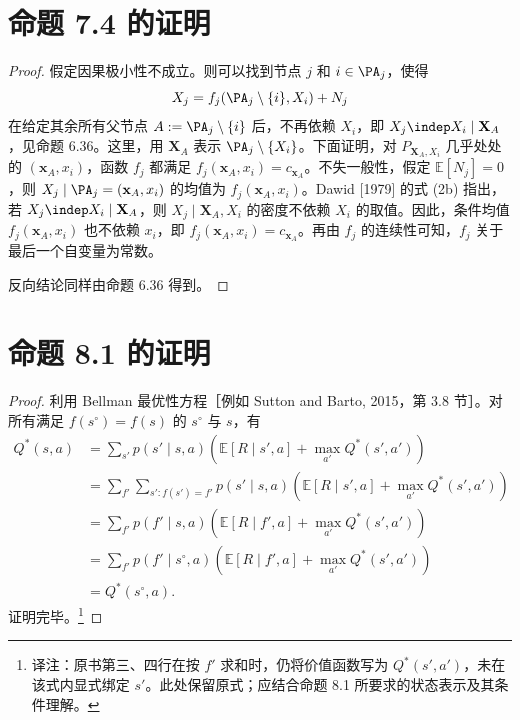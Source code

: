 \section{命题 7.4 的证明}
\begin{proof}
假定因果极小性不成立。则可以找到节点 $j$ 和 $i\in\PA_j$，使得
\[X_j=f_j(\PA_j\setminus\{i\},X_i)+N_j\]
在给定其余所有父节点 $A:=\PA_j\setminus\{i\}$ 后，不再依赖 $X_i$，即 $X_j\indep X_i\mid\mathbf X_A$，见命题 6.36。这里，用 $\mathbf X_A$ 表示 $\PA_j\setminus\{X_i\}$。下面证明，对 $P_{\mathbf X_A,X_i}$ 几乎处处的 $(\mathbf x_A,x_i)$，函数 $f_j$ 都满足 $f_j(\mathbf x_A,x_i)=c_{\mathbf x_A}$。不失一般性，假定 $\mathbb E[N_j]=0$，则 $X_j\mid\PA_j=(\mathbf x_A,x_i)$ 的均值为 $f_j(\mathbf x_A,x_i)$。Dawid [1979] 的式 (2b) 指出，若 $X_j\indep X_i\mid\mathbf X_A$，则 $X_j\mid\mathbf X_A,X_i$ 的密度不依赖 $X_i$ 的取值。因此，条件均值 $f_j(\mathbf x_A,x_i)$ 也不依赖 $x_i$，即 $f_j(\mathbf x_A,x_i)=c_{\mathbf x_A}$。再由 $f_j$ 的连续性可知，$f_j$ 关于最后一个自变量为常数。

反向结论同样由命题 6.36 得到。
\end{proof}

\section{命题 8.1 的证明}
\begin{proof}
利用 Bellman 最优性方程［例如 Sutton and Barto, 2015，第 3.8 节］。对所有满足 $f(s^\circ)=f(s)$ 的 $s^\circ$ 与 $s$，有
\[\begin{aligned}
Q^*(s,a)
&=\sum_{s'}p(s'\mid s,a)\left(\mathbb E[R\mid s',a]+\max_{a'}Q^*(s',a')\right)\\
&=\sum_{f'}\sum_{s'\colon f(s')=f'}p(s'\mid s,a)
\left(\mathbb E[R\mid s',a]+\max_{a'}Q^*(s',a')\right)\\
&=\sum_{f'}p(f'\mid s,a)\left(\mathbb E[R\mid f',a]+\max_{a'}Q^*(s',a')\right)\\
&=\sum_{f'}p(f'\mid s^\circ,a)\left(\mathbb E[R\mid f',a]+\max_{a'}Q^*(s',a')\right)\\
&=Q^*(s^\circ,a).
\end{aligned}\]
证明完毕。\footnote{译注：原书第三、四行在按 $f'$ 求和时，仍将价值函数写为 $Q^*(s',a')$，未在该式内显式绑定 $s'$。此处保留原式；应结合命题 8.1 所要求的状态表示及其条件理解。}
\end{proof}

